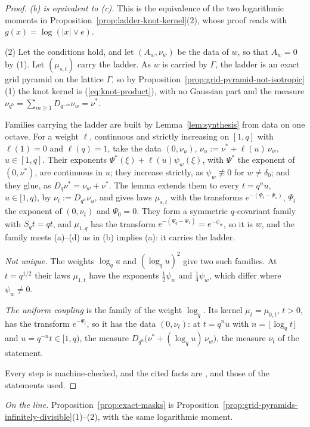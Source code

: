 \begin{proof}
\emph{(b) is equivalent to (c).} This is the equivalence of the two logarithmic moments in
Proposition~\ref{prop:ladder-knot-kernel}(2), whose proof reads  with
$g(x) = \log(|x| \vee e)$.

(2) Let the conditions hold, and let $(A_w, \nu_w)$ be the data of $w$, so that $A_w = 0$ by (1).
Let $(\mu_{s,t})$ carry the ladder. As $w$ is carried by $\Gamma$, the ladder is an exact grid
pyramid on the lattice $\Gamma$, so
by Proposition~\ref{prop:grid-pyramid-not-isotropic}(1) the knot kernel is (\ref{eq:knot-product}),
with no Gaussian part and the \Levy{} measure $\nu_{q^0} = \sum_{m \ge 1}D_{q^{-m}}\nu_w = \nu^*$.

Families carrying the ladder are built by Lemma~\ref{lem:synthesis} from data on one octave. For a
weight $\ell$, continuous and strictly increasing on $[1, q]$ with $\ell(1) = 0$ and $\ell(q) = 1$,
take the data $(0, \nu_u)$, $\nu_u := \nu^* + \ell(u)\,\nu_w$, $u \in [1, q]$. Their exponents
$\Psi^*(\xi) + \ell(u)\psi_w(\xi)$, with $\Psi^*$ the exponent of $(0, \nu^*)$, are continuous in $u$;
they increase strictly, as $\psi_w \not\equiv 0$ for $w \ne \delta_0$; and they glue, as
$D_q\nu^* = \nu_w + \nu^*$. The lemma extends them to every $t = q^nu$, $u \in [1, q)$, by
$\nu_t := D_{q^n}\nu_u$, and gives laws $\mu_{s,t}$ with the transforms $e^{-(\Psi_t - \Psi_s)}$,
$\Psi_t$ the exponent of $(0, \nu_t)$ and $\Psi_0 = 0$. They form a symmetric $q$-covariant family
with $S_qt = qt$, and $\mu_{1,q}$ has the transform $e^{-(\Psi_q - \Psi_1)} = e^{-\psi_w}$, so it is
$w$, and the family meets (a)--(d) as in (b) implies (a): it carries the ladder.

\emph{Not unique.} The weights $\log_qu$ and $(\log_qu)^2$ give two such families. At
$t = q^{1/2}$ their laws $\mu_{1,t}$ have the exponents $\tfrac12\psi_w$ and $\tfrac14\psi_w$, which
differ where $\psi_w \ne 0$.

\emph{The uniform coupling} is the family of the weight $\log_q$. Its kernel $\mu_t = \mu_{0,t}$,
$t > 0$, has the transform $e^{-\Psi_t}$, so it has the data $(0, \nu_t)$: at $t = q^nu$ with
$n = \lfloor\log_qt\rfloor$ and $u = q^{-n}t \in [1, q)$, the \Levy{} measure
$D_{q^n}\bigl(\nu^* + (\log_qu)\,\nu_w\bigr)$, the measure $\nu_t$ of the statement.

Every step is machine-checked, and the cited facts are ,  and those of the
statements used.
\end{proof}

\emph{On the line.} Proposition~\ref{prop:exact-masks} is
Proposition~\ref{prop:grid-pyramids-infinitely-divisible}(1)--(2), with the same logarithmic
moment.

